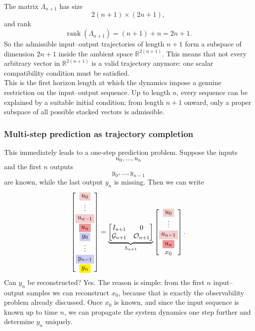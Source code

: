 The matrix $\Lambda_{n+1}$ has size
\[
2(n+1)\times(2n+1),
\]
and rank
\[
\operatorname{rank}(\Lambda_{n+1})=(n+1)+n=2n+1.
\]
So the admissible input--output trajectories of length $n+1$ form a subspace of dimension $2n+1$ inside the ambient space $\mathbb{R}^{2(n+1)}$. This means that not every arbitrary vector in $\mathbb{R}^{2(n+1)}$ is a valid trajectory anymore: one scalar compatibility condition must be satisfied.\\
This is the first horizon length at which the dynamics impose a genuine restriction on the input--output sequence. Up to length $n$, every sequence can be explained by a suitable initial condition; from length $n+1$ onward, only a proper subspace of all possible stacked vectors is admissible.\\
\subsubsection{Multi-step prediction as trajectory completion}
This immediately leads to a one-step prediction problem. Suppose the inputs
\[
u_0,\dots,u_n
\]
and the first $n$ outputs
\[
y_0,\dots,y_{n-1}
\]
are known, while the last output $y_n$ is missing. Then we can write
\[
\begin{bmatrix}
\colorbox{lightred}{$\displaystyle u_0$}\\
\vdots\\
\colorbox{lightred}{$\displaystyle u_{n-1}$}\\
\colorbox{midred}{$\displaystyle u_n$}\\
\colorbox{lightblue}{$\displaystyle y_0$}\\
\vdots\\
\colorbox{lightblue}{$\displaystyle y_{n-1}$}\\
\colorbox{yellowblock}{$\displaystyle y_n$}
\end{bmatrix}
=
\underbrace{
\begin{bmatrix}
I_{n+1} & 0\\
\mathcal{G}_{n+1} & \mathcal{O}_{n+1}
\end{bmatrix}}_{\Lambda_{n+1}}
\begin{bmatrix}
\colorbox{lightred}{$\displaystyle u_0$}\\
\vdots\\
\colorbox{lightred}{$\displaystyle u_{n-1}$}\\
\colorbox{midred}{$\displaystyle u_n$}\\
x_0
\end{bmatrix}.
\]
Can $y_n$ be reconstructed? Yes. The reason is simple: from the first $n$ input--output samples we can reconstruct $x_0$, because that is exactly the observability problem already discussed. Once $x_0$ is known, and since the input sequence is known up to time $n$, we can propagate the system dynamics one step further and determine $y_n$ uniquely.\\
